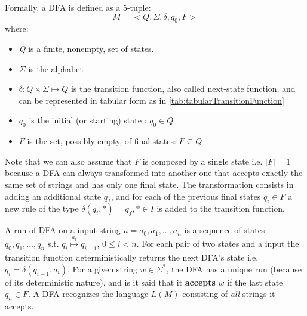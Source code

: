 Formally, a DFA is defined as a 5-tuple:
\[M = <Q,\Sigma,\delta,q_0,F>\] 
where:
\begin{itemize}
  \item \textit{Q} is a finite, nonempty, set of states.
\item $\Sigma$ is the alphabet
\item $ \delta : Q \times \Sigma \longmapsto Q  $ is the
transition function, also called next-state function, and can be represented in
tabular form  as  in \ref{tab:tabularTransitionFunction}
\item $q_0 $ is the initial (or starting) state :
$ q_0 \in  Q $
\item  $F $ is the set, possibly empty, of final states:
$ F \subseteq Q $

\end{itemize}
Note that we can also assume that $F$ is composed by a single state i.e. $\left\vert{F}\right\vert=1$ because a DFA can always transformed into another one that accepts exactly the same set of strings and has only one final state. The transformation consists in adding an additional state $q_f$, and for each of the previous final states $q_i \in
F$ a new rule of the type $\delta(q_i,*)=q_f, * \in I $ is added to the transition function.

A run of DFA on a input string $u = a_0,a_1,\ldots,a_n$ is a
sequence of states  $ q_0,q_1,\ldots,q_n$ s.t.
$q_i  \overset{a_i}{\longmapsto} q_{i+1} $,
$ 0 \leq i < n$. For each pair of two states
and a input the transition function deterministically returns the next DFA's
state i.e.  $q_i=\delta(q_{i-1},a_{i}) $.
For a given string $\textit{w}\in \Sigma^* $, the DFA has a
unique run (because of its deterministic nature), and is it said that it \textbf{accepts} $w$ if the last state $q_n \in F$. A DFA recognizes the
language $L(M)$ consisting of \textit{all} strings it accepts.

